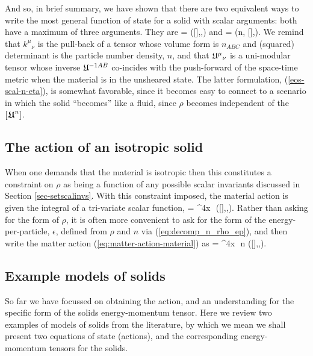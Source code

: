 And so, in brief summary, we have  shown that there are two  equivalent   ways to write the most general function of state for a solid with scalar arguments: both have a maximum of three arguments. They are
\bse
\bea
\rho = \rho\left([],,\right)
\eea 
and
\bea
\label{eos-scal-n-eta}
\rho = \rho\left(n, [\gbm{\unimod}],\left[\gbm{\unimod}^2\right]\right).
\eea
\ese
We remind that ${k^{\mu}}_{\nu}$ is the pull-back of a tensor whose volume form is $n_{ABC}$ and (squared) determinant is the particle number density, $n$, and that  ${\mathfrak{U}^{\mu}}_{\nu}$ is a uni-modular tensor whose inverse $\mathfrak{U}^{-1AB}$ co-incides with the push-forward of the space-time metric when the material is in the unsheared state. The latter formulation, (\ref{eos-scal-n-eta}), is somewhat favorable, since it becomes easy to connect to a scenario in which the solid ``becomes'' like a fluid, since $\rho$ becomes independent of the $[\bm{\mathfrak{U}}^n]$.
\subsection{The action of an isotropic solid}
When one demands that the material is isotropic then this constitutes a constraint on  $\rho$ as being a  function of any possible scalar invariants discussed in Section \ref{sec-setscalinvs}. With this constraint imposed, the material action is given the integral of a tri-variate scalar function,
\bea
\label{eq:matter-action-material}
 = \int \dd^4x\,\, \rho\left([],,\right).
\eea
Rather than asking for the form of $\rho$, it is often more convenient to ask for the form of the energy-per-particle, $\epsilon$, defined from $\rho$ and $n$ via (\ref{eq:decomp_n_rho_ep}),  and then write the matter action (\ref{eq:matter-action-material}) as
\bea
{} = \int \dd^4x\,\, n \epsilon\left([],,\right).
\eea
\subsection{Example models of solids}
So far we have focussed on obtaining the action, and an understanding for the specific form of the solids energy-momentum tensor. Here we review two examples of models of solids from the literature, by which we mean we shall present two equations of state (actions), and the corresponding energy-momentum tensors for the solids.




